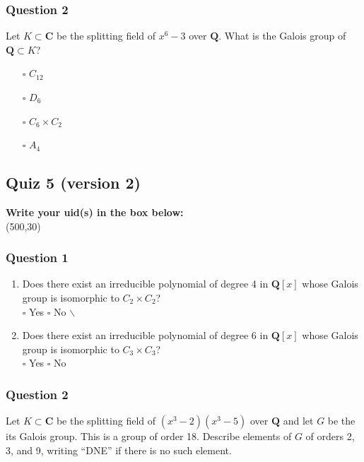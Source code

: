 \documentclass[11pt]{article}
\begin{document}
\subsubsection{Question 2}
\label{sec:org4f8747e}
Let \(K \subset \mathbf{C}\) be the splitting field of \(x^6-3\) over \(\mathbf{Q}\).
What is the Galois group of \(\mathbf{Q} \subset K\)?

\begin{itemize}
\item[{$\square$}] \(C_{12}\)\\
\item[{$\square$}] \(D_6\)\\
\item[{$\square$}] \(C_6 \times C_2\)\\
\item[{$\square$}] \(A_4\)
\end{itemize}
\subsection{Quiz 5 (version 2)}
\label{sec:orgbfcdad6}
\vspace{1cm}

\noindent
\textbf{Write your uid(s) in the box below:}\\
\framebox(500,30)

\vspace{1cm}
\subsubsection{Question 1}
\label{sec:org198d056}
\begin{enumerate}
\item Does there exist an irreducible polynomial of degree 4 in \(\mathbf{Q}[x]\) whose Galois group is isomorphic to \(C_2 \times C_2\)?\\

\qquad \(\square\) Yes \qquad \(\square\)   No $\backslash$\a

\item Does there exist an irreducible polynomial of degree 6 in \(\mathbf{Q}[x]\) whose Galois group is isomorphic to \(C_3 \times C_3\)?\\

\qquad \(\square\) Yes \qquad \(\square\)   No
\end{enumerate}
\subsubsection{Question 2}
\label{sec:org659b651}
Let \(K \subset \mathbf{C}\) be the splitting field of \((x^3-2)(x^3-5)\) over \(\mathbf{Q}\) and let \(G\) be the its Galois group.  This is a group of order 18. Describe elements of \(G\) of orders 2, 3, and 9, writing ``DNE'' if there is no such element.
\end{document}

